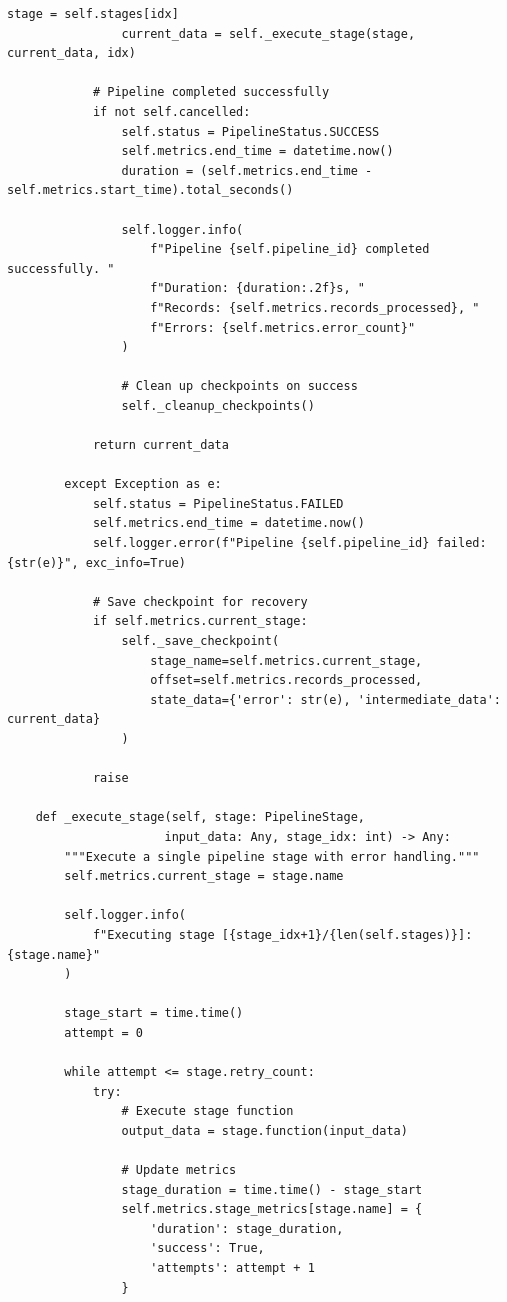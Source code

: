 \begin{lstlisting}[style=python, caption=DataPipeline with Full Lifecycle Management]
                stage = self.stages[idx]
                current_data = self._execute_stage(stage, current_data, idx)

            # Pipeline completed successfully
            if not self.cancelled:
                self.status = PipelineStatus.SUCCESS
                self.metrics.end_time = datetime.now()
                duration = (self.metrics.end_time - self.metrics.start_time).total_seconds()

                self.logger.info(
                    f"Pipeline {self.pipeline_id} completed successfully. "
                    f"Duration: {duration:.2f}s, "
                    f"Records: {self.metrics.records_processed}, "
                    f"Errors: {self.metrics.error_count}"
                )

                # Clean up checkpoints on success
                self._cleanup_checkpoints()

            return current_data

        except Exception as e:
            self.status = PipelineStatus.FAILED
            self.metrics.end_time = datetime.now()
            self.logger.error(f"Pipeline {self.pipeline_id} failed: {str(e)}", exc_info=True)

            # Save checkpoint for recovery
            if self.metrics.current_stage:
                self._save_checkpoint(
                    stage_name=self.metrics.current_stage,
                    offset=self.metrics.records_processed,
                    state_data={'error': str(e), 'intermediate_data': current_data}
                )

            raise

    def _execute_stage(self, stage: PipelineStage,
                      input_data: Any, stage_idx: int) -> Any:
        """Execute a single pipeline stage with error handling."""
        self.metrics.current_stage = stage.name

        self.logger.info(
            f"Executing stage [{stage_idx+1}/{len(self.stages)}]: {stage.name}"
        )

        stage_start = time.time()
        attempt = 0

        while attempt <= stage.retry_count:
            try:
                # Execute stage function
                output_data = stage.function(input_data)

                # Update metrics
                stage_duration = time.time() - stage_start
                self.metrics.stage_metrics[stage.name] = {
                    'duration': stage_duration,
                    'success': True,
                    'attempts': attempt + 1
                }


\end{lstlisting}
